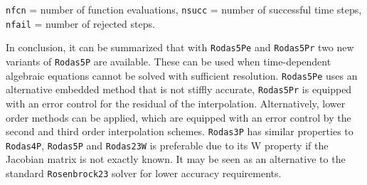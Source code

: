 \documentclass{juliacon}
\begin{document}
\begin{table} \label{tab:battery}
\begin{tabnote}
\verb|nfcn| = number of function evaluations,
\verb|nsucc| = number of successful time steps, 
 \verb|nfail| = number of rejected steps.
 \end{tabnote}
\end{table}

In conclusion, it can be summarized that with \verb|Rodas5Pe| and \verb|Rodas5Pr| two new variants of \verb|Rodas5P| are available. 
These can be used when time-dependent algebraic equations cannot be solved with sufficient resolution.
\verb|Rodas5Pe| uses an alternative embedded method that is not stiffly accurate, \verb|Rodas5Pr| is equipped with an error control for the residual of the interpolation. 
Alternatively, lower order methods can be applied, which are equipped with an error control by the second and third order interpolation schemes.
\verb|Rodas3P| has similar properties to \verb|Rodas4P|, \verb|Rodas5P| and \verb|Rodas23W| is preferable due to its W property if the Jacobian matrix is not exactly known.
It may be seen as an alternative to the standard \verb|Rosenbrock23| solver for lower accuracy requirements.


\end{document}
